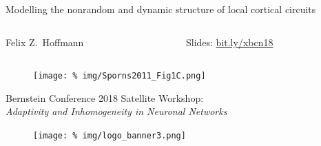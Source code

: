 \begin{frame}
  \vspace{0.6cm}
  
  \begin{center} 
    \huge Modelling the nonrandom and dynamic structure of local
    cortical circuits
  \end{center}
  
  \vspace{0.5cm}

  \large
  \begin{columns}[t]
    \hfill\Large
    \begin{column}{0.4\textwidth}
      \minipage[c][0.2\textheight][s]{\columnwidth}
      \hspace{0.6cm} Felix Z.~Hoffmann \textcolor{white}{y}
      \endminipage                 
    \end{column}
    \begin{column}{0.4\textwidth}
      \minipage[c][0.2\textheight][s]{\columnwidth}
      \hspace{0.6cm} Slides: \href{http://bit.ly/xbcn18}{bit.ly/xbcn18}
      \endminipage           
    \end{column}
    \hfill
  \end{columns}

  \vspace{-1cm}

  \begin{figure}
    \centering
    \texttt{[image: \%
      img/Sporns2011\_Fig1C.png]} %
    \nocite{Sporns2011}
  \end{figure}


  \begin{center}
    \Large Bernstein Conference 2018 Satellite Workshop:\\
    \textit{Adaptivity and Inhomogeneity in Neuronal Networks}
  \end{center}

  \vspace{0.2cm}
  
  \begin{figure}
    \centering
    \texttt{[image: \%
      img/logo\_banner3.png]} %
  \end{figure}



\end{frame}

